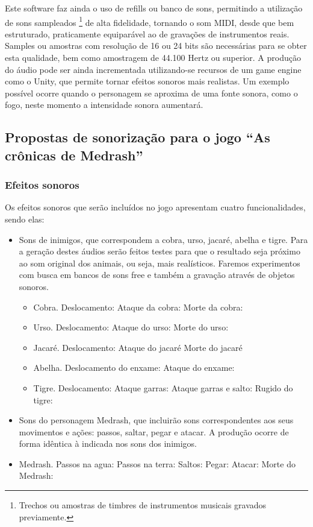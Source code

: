 Este software faz ainda o uso de refills ou banco de sons, permitindo 
a utilização de sons sampleados
\footnote{Trechos ou amostras de timbres de instrumentos musicais 
gravados previamente.}
 de alta fidelidade, tornando o som MIDI, desde que bem estruturado,
 praticamente equiparável ao de gravações de instrumentos reais. Samples 
ou amostras com resolução de 16 ou 24 bits são necessárias para se obter
 esta qualidade, bem como amostragem de 44.100 Hertz ou superior. 
A produção do áudio pode ser ainda incrementada utilizando-se recursos
de um game engine como o Unity, que permite tornar efeitos sonoros mais
 realistas. Um exemplo possível ocorre quando o personagem se aproxima 
de uma fonte sonora, como o fogo, neste momento a intensidade sonora
 aumentará.

\subsection{Propostas de sonorização para o jogo ``As crônicas 
de Medrash''}

\subsubsection{Efeitos sonoros}
Os efeitos sonoros que serão incluídos no jogo apresentam cuatro
 funcionalidades, sendo elas:
\begin{itemize}
\item Sons de inimigos, que correspondem a cobra, urso, jacaré, abelha e tigre. 
Para a geração destes áudios serão feitos testes para que o resultado 
seja próximo ao som original dos animais, ou seja, mais realísticos. 
Faremos experimentos com busca em bancos de sons free e também a 
gravação através de objetos sonoros. 
\begin{itemize}
\item Cobra.
Deslocamento:
Ataque da cobra:
Morte da cobra:
\item Urso.
Deslocamento:
Ataque do urso:
Morte do urso:
\item Jacaré.
Deslocamento:
Ataque do jacaré
Morte do jacaré
\item Abelha.
Deslocamento do enxame:
Ataque do enxame:
\item Tigre.
Deslocamento:
Ataque garras:
Ataque garras e salto:
Rugido do tigre:
\end{itemize}

\item Sons do personagem Medrash, que incluirão sons correspondentes
 aos seus movimentos e ações: passos, saltar, pegar e atacar. A
 produção ocorre de forma idêntica à indicada nos sons dos inimigos.

\item Medrash.
Passos na agua:
Passos na terra:
Saltos:
Pegar:
Atacar:
Morte do Medrash:
\end{itemize}

